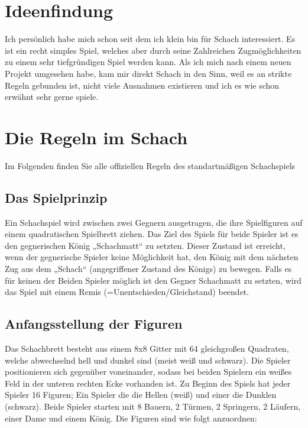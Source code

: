 \documentclass[a4paper, 10pt]{scrartcl}
\begin{document}
\section{Ideenfindung}
Ich persönlich habe mich schon seit dem ich klein bin für Schach interessiert.
Es ist ein recht simples Spiel, welches aber durch seine Zahlreichen Zugmöglichkeiten zu einem sehr tiefgründigen Spiel werden kann.
Als ich mich nach einem neuen Projekt umgesehen habe, kam mir direkt Schach in den Sinn, weil es an strikte Regeln gebunden ist, nicht viele Ausnahmen existieren
und ich es wie schon erwähnt sehr gerne spiele.

\section{Die Regeln im Schach}
Im Folgenden finden Sie alle offiziellen Regeln des standartmäßigen Schachspiels

\subsection{Das Spielprinzip}
Ein Schachspiel wird zwischen zwei Gegnern ausgetragen, die ihre Spielfiguren auf einem quadratischen Spielbrett ziehen. 
Das Ziel des Spiels für beide Spieler ist es den gegnerischen König „Schachmatt“ zu setzten. Dieser Zustand ist erreicht, wenn der gegnerische Spieler keine Möglichkeit hat, den König mit dem nächsten Zug aus dem „Schach“ (angegriffener Zustand des Königs) zu bewegen. 
Falls es für keinen der Beiden Spieler möglich ist den Gegner Schachmatt zu setzten, wird das Spiel mit einem Remis (=Unentschieden/Gleichstand) beendet.

\subsection{Anfangsstellung der Figuren}
Das Schachbrett besteht aus einem 8x8 Gitter mit 64 gleichgroßen Quadraten, welche abwechselnd hell und dunkel sind (meist weiß und schwarz).
Die Spieler positionieren sich gegenüber voneinander, sodass bei beiden Spielern ein weißes Feld in der unteren rechten Ecke vorhanden ist.
Zu Beginn des Spiels hat jeder Spieler 16 Figuren; Ein Spieler die die Hellen (weiß) und einer die Dunklen (schwarz).
Beide Spieler starten mit 8 Bauern, 2 Türmen, 2 Springern, 2 Läufern, einer Dame und einem König.
Die Figuren sind wie folgt anzuordnen:
\end{document}
